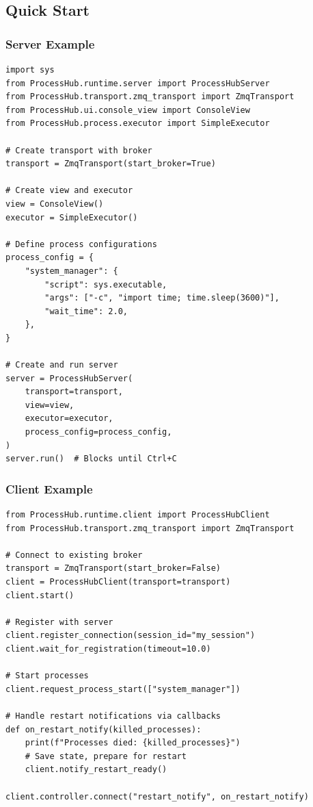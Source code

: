 \subsection{Quick Start}

\subsubsection{Server Example}

\begin{verbatim}
import sys
from ProcessHub.runtime.server import ProcessHubServer
from ProcessHub.transport.zmq_transport import ZmqTransport
from ProcessHub.ui.console_view import ConsoleView
from ProcessHub.process.executor import SimpleExecutor

# Create transport with broker
transport = ZmqTransport(start_broker=True)

# Create view and executor
view = ConsoleView()
executor = SimpleExecutor()

# Define process configurations
process_config = {
    "system_manager": {
        "script": sys.executable,
        "args": ["-c", "import time; time.sleep(3600)"],
        "wait_time": 2.0,
    },
}

# Create and run server
server = ProcessHubServer(
    transport=transport,
    view=view,
    executor=executor,
    process_config=process_config,
)
server.run()  # Blocks until Ctrl+C
\end{verbatim}

\subsubsection{Client Example}

\begin{verbatim}
from ProcessHub.runtime.client import ProcessHubClient
from ProcessHub.transport.zmq_transport import ZmqTransport

# Connect to existing broker
transport = ZmqTransport(start_broker=False)
client = ProcessHubClient(transport=transport)
client.start()

# Register with server
client.register_connection(session_id="my_session")
client.wait_for_registration(timeout=10.0)

# Start processes
client.request_process_start(["system_manager"])

# Handle restart notifications via callbacks
def on_restart_notify(killed_processes):
    print(f"Processes died: {killed_processes}")
    # Save state, prepare for restart
    client.notify_restart_ready()

client.controller.connect("restart_notify", on_restart_notify)
\end{verbatim}

